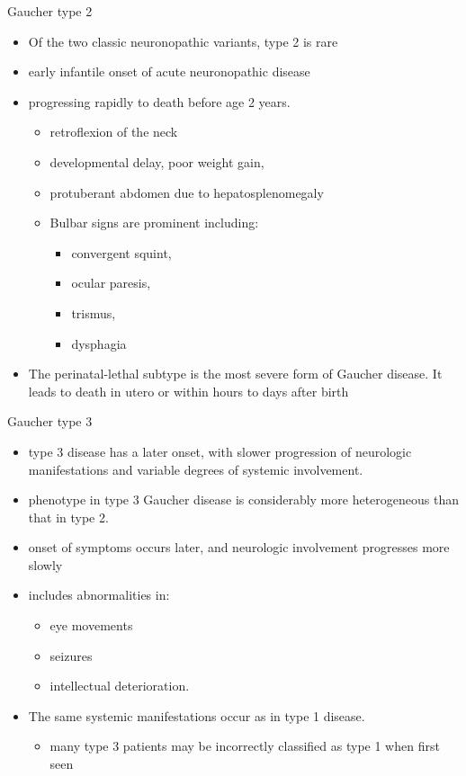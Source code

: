 \documentclass[presentation, smaller]{beamer}
\begin{document}
\begin{frame}[label={sec:orgheadline10}]{Gaucher type 2}
\begin{itemize}
\item Of the two classic neuronopathic variants, type 2 is rare
\item early infantile onset of acute neuronopathic disease
\item progressing rapidly to death before age 2 years.

\begin{itemize}
\item retroflexion of the neck
\item developmental delay, poor weight gain,
\item protuberant abdomen due to hepatosplenomegaly
\item Bulbar signs are prominent including:
\begin{itemize}
\item convergent squint,
\item ocular paresis,
\item trismus,
\item dysphagia
\end{itemize}
\end{itemize}

\item The perinatal-lethal subtype is the most severe form of Gaucher
disease. It leads to death in utero or within hours to days after
birth
\end{itemize}
\end{frame}

\begin{frame}[label={sec:orgheadline11}]{Gaucher type 3}
\begin{itemize}
\item type 3 disease has a later onset, with slower progression of
neurologic manifestations and variable degrees of systemic
involvement.
\item phenotype in type 3 Gaucher disease is considerably more
heterogeneous than that in type 2.

\item onset of symptoms occurs later, and neurologic involvement
progresses more slowly

\item includes abnormalities in:
\begin{itemize}
\item eye movements
\item seizures
\item intellectual deterioration.
\end{itemize}

\item The same systemic manifestations occur as in type 1 disease.
\begin{itemize}
\item many type 3 patients may be incorrectly classified as type 1 when
first seen
\end{itemize}
\end{itemize}
\end{frame}
\end{document}
